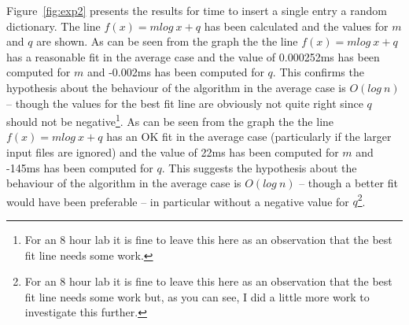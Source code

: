 \fi

Figure~\ref{fig:exp2} presents the results for time to insert a single entry  a random dictionary.  The line $f(x) = m log~x + q$ has been calculated and the values for $m$ and $q$ are shown. \ifc As can be seen from the graph the the line $f(x) = m log~x + q$ has a reasonable fit in the average case and the value of 0.000252ms has been computed for $m$ and -0.002ms has been computed for $q$.  This confirms the hypothesis about the behaviour of the algorithm in the average case  is $O(log~n)$ -- though the values for the best fit line are obviously not quite right since $q$ should not be negative\footnote{For an 8 hour lab it is fine to leave this here as an observation that the best fit line needs some work.}. \fi  
\ifjava As can be seen from the graph the the line $f(x) = m log~x + q$ has an OK fit in the average case (particularly if the larger input files are ignored) and the value of 22ms has been computed for $m$ and -145ms has been computed for $q$.  This suggests the hypothesis about the behaviour of the algorithm in the average case  is $O(log~n)$ -- though a better fit would have been preferable -- in particular without a negative value for $q$\footnote{For an 8 hour lab it is fine to leave this here as an observation that the best fit line needs some work but, as you can see, I did a little more work to investigate this further.}.  



